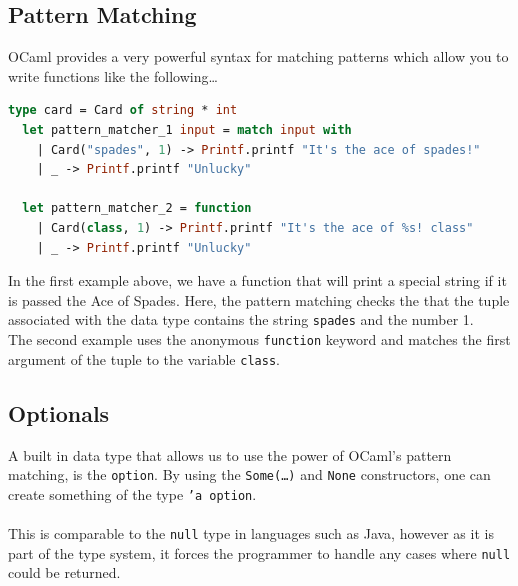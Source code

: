 \documentclass[12pt,a4paper,twoside,openright]{report}
\begin{document}
		\subsection*{Pattern Matching}
		OCaml provides a very powerful syntax for matching patterns which allow you to write functions like the following\ldots 
		\begin{lstlisting}[language=Caml,showstringspaces=false] 
  type card = Card of string * int
  let pattern_matcher_1 input = match input with 
    | Card("spades", 1) -> Printf.printf "It's the ace of spades!"
    | _ -> Printf.printf "Unlucky"
  
  let pattern_matcher_2 = function 
    | Card(class, 1) -> Printf.printf "It's the ace of %s! class"
    | _ -> Printf.printf "Unlucky"
		\end{lstlisting}
		In the first example above, we have a function that will print a special string if it is passed the Ace of Spades. 
		Here, the pattern matching checks the that the tuple associated with the data type contains the string \texttt{spades} and the number 1.\\
		The second example uses the anonymous \texttt{function} keyword and matches the first argument of the tuple to the variable \texttt{class}.
		\subsection*{Optionals}
		A built in data type that allows us to use the power of OCaml's pattern matching, is the \texttt{option}. By using the \texttt{Some(\ldots)} and \texttt{None} constructors, one can create something of the type \texttt{'a option}. \\
		\\
		This is comparable to the \texttt{null} type in languages such as Java, however as it is part of the type system, it forces the programmer to handle any cases where \texttt{null} could be returned.
\end{document}
